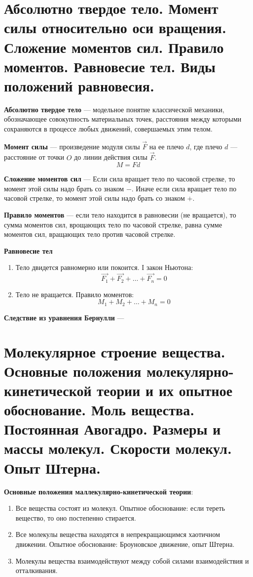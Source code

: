 \documentclass{report}
\begin{document}
\part{Абсолютно твердое тело. 
Момент силы относительно оси вращения. 
Сложение моментов сил. 
Правило моментов. 
Равновесие тел. 
Виды положений равновесия.}

{\bf Абсолютно твердое тело} ---
модельное понятие классической механики, обозначающее совокупность материальных 
точек, расстояния между которыми сохраняются в процессе любых движений, совершаемых этим телом.

{\bf Момент силы} ---
произведение модуля силы $\vec{F}$ на ее плечо $d$, где плечо $d$ — 
расстояние от точки $O$ до линии действия силы $\vec{F}$. 
$$
M=Fd
$$

{\bf Сложение моментов сил} ---
Если сила вращает тело по часовой стрелке, то момент этой силы надо брать со знаком $-$.
Иначе если сила вращает тело по часовой стрелке, то момент этой силы надо брать со знаком $+$.

{\bf Правило моментов} ---
если тело находится в равновесии (не вращается), то сумма моментов сил, врощающих тело по часовой
стрелке, равна сумме моментов сил, вращающих тело против часовой стрелке.

{\bf Равновесие тел}
\begin{enumerate}
  \item Тело двидется равномерно или покоится. I закон Ньютона:
  $$
  \vec{F_1}+\vec{F_2}+\dots+\vec{F_n}=0
  $$
  \item Тело не вращается. Правило моментов:
  $$
  M_1+M_2+\dots+M_n=0
  $$
\end{enumerate}

{\bf Следствие из уравнения Бернулли} ---



\part{Молекулярное строение вещества. 
Основные положения молекулярно-кинетической теории и их опытное обоснование. 
Моль вещества. 
Постоянная Авогадро.
Размеры и массы молекул. 
Скорости молекул. 
Опыт Штерна.  }

{\bf Основные положения маллекулярно-кинетической теории}:
\begin{enumerate}
  \item Все вещества состоят из молекул. 
  Опытное обоснование: если тереть вещество, то оно постепенно стирается.
  \item Все молекулы вещества находятся в непрекращающимся хаотичном движении.
  Опытное обоснование: Броуновское движение, опыт Штерна.
  \item Молекулы вещества взаимодействуют между собой силами взаимодействия и отталкивания.
\end{enumerate}
\end{document}
